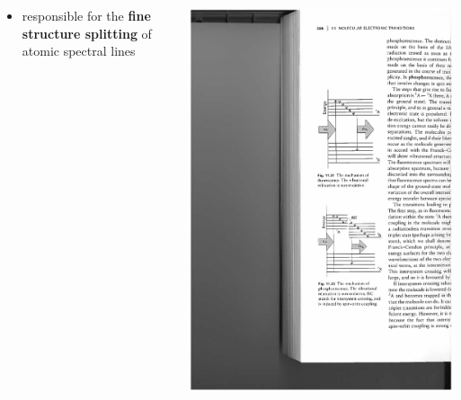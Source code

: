 \documentclass[mathserif,8pt]{beamer}
\begin{document}
\begin{frame}
\begin{columns}
\begin{column}{.40\textwidth}
\begin{itemize}
		\ \\
	\item	responsible for the \textbf{fine structure splitting} of atomic spectral lines
    \end{itemize}
    \end{column}
    \begin{column}{.40\textwidth}
	\includegraphics[viewport = 230 230 380 400, clip, scale=0.8]{figures/phosphorescence.pdf}
    \end{column}
    \end{columns}
\end{frame}
\end{document}
